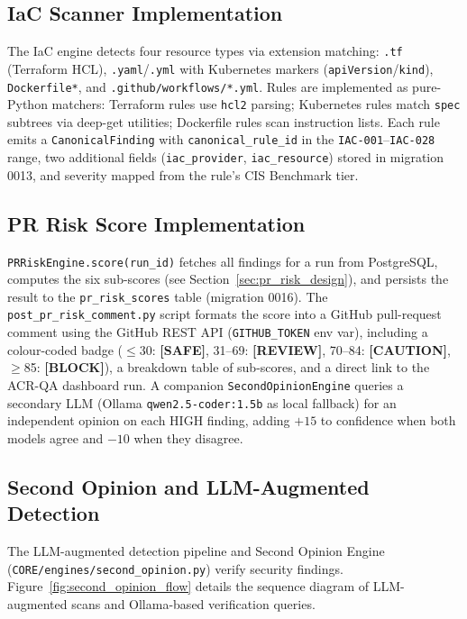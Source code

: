 \subsection{IaC Scanner Implementation}

The IaC engine detects four resource types via extension matching: \texttt{.tf} (Terraform HCL), \texttt{.yaml}/\texttt{.yml} with Kubernetes markers (\texttt{apiVersion}/\texttt{kind}), \texttt{Dockerfile*}, and \texttt{.github/workflows/*.yml}. Rules are implemented as pure-Python matchers: Terraform rules use \texttt{hcl2} parsing; Kubernetes rules match \texttt{spec} subtrees via deep-get utilities; Dockerfile rules scan instruction lists. Each rule emits a \texttt{CanonicalFinding} with \texttt{canonical\_rule\_id} in the \texttt{IAC-001}--\texttt{IAC-028} range, two additional fields (\texttt{iac\_provider}, \texttt{iac\_resource}) stored in migration 0013, and severity mapped from the rule's CIS Benchmark tier.

\subsection{PR Risk Score Implementation}

\texttt{PRRiskEngine.score(run\_id)} fetches all findings for a run from PostgreSQL, computes the six sub-scores (see Section~\ref{sec:pr_risk_design}), and persists the result to the \texttt{pr\_risk\_scores} table (migration 0016). The \texttt{post\_pr\_risk\_comment.py} script formats the score into a GitHub pull-request comment using the GitHub REST API (\texttt{GITHUB\_TOKEN} env var), including a colour-coded badge ($\leq$30: \textbf{[SAFE]}, 31--69: \textbf{[REVIEW]}, 70--84: \textbf{[CAUTION]}, $\geq$85: \textbf{[BLOCK]}), a breakdown table of sub-scores, and a direct link to the ACR-QA dashboard run. A companion \texttt{SecondOpinionEngine} queries a secondary LLM (Ollama \texttt{qwen2.5-coder:1.5b} as local fallback) for an independent opinion on each HIGH finding, adding $+15$ to confidence when both models agree and $-10$ when they disagree.

\subsection{Second Opinion and LLM-Augmented Detection}

The LLM-augmented detection pipeline and Second Opinion Engine
(\texttt{CORE/\allowbreak engines/\allowbreak second\_opinion.py}) verify security findings.
Figure~\ref{fig:second_opinion_flow} details the sequence diagram of LLM-augmented scans and Ollama-based verification queries.

